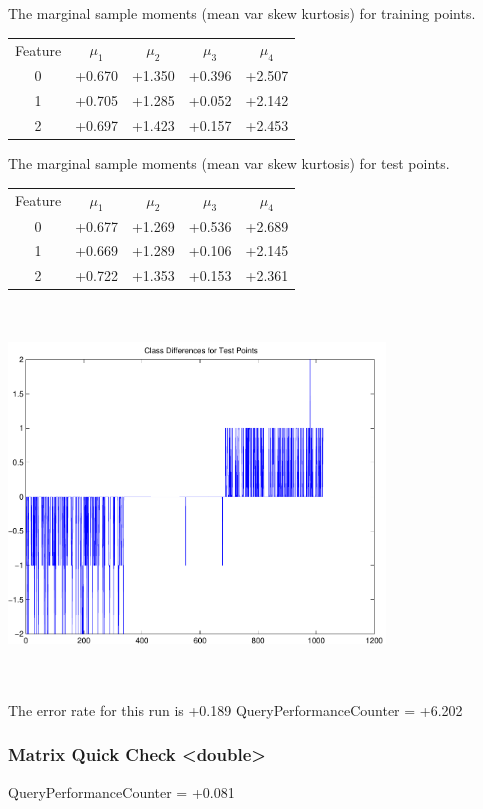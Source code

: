 \documentclass[9pt]{article}
\theoremstyle{plain}
\theoremstyle{definition}
\theoremstyle{remark}
\numberwithin{equation}{section}
\begin{document}
The marginal sample moments (mean var skew kurtosis) for training points.\newline
\begin{tabular}{ c |  c  c  c  c}
Feature & $\mu_1$ & $\mu_2$ & $\mu_3$ & $\mu_4$ \\
0 & +0.670 & +1.350 & +0.396& +2.507 \\
\hline
1 & +0.705 & +1.285 & +0.052& +2.142 \\
\hline
2 & +0.697 & +1.423 & +0.157& +2.453 \\
\hline
\end{tabular}
\newline
The marginal sample moments (mean var skew kurtosis) for test points.\newline
\begin{tabular}{ c | c  c  c  c}
Feature & $\mu_1$ & $\mu_2$ & $\mu_3$ & $\mu_4$ \\
0 & +0.677 & +1.269 & +0.536& +2.689\\
\hline
1 & +0.669 & +1.289 & +0.106& +2.145\\
\hline
2 & +0.722 & +1.353 & +0.153& +2.361\\
\hline
\end{tabular}\newline
\includegraphics[width=10.0cm,height=10.0cm]{classDiffs.pdf}

The error rate for this run is +0.189\newline
QueryPerformanceCounter  =  +6.202
\subsubsection{Matrix Quick Check <double>}
QueryPerformanceCounter  =  +0.081
\end{document}
